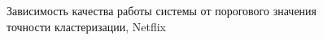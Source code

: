 \documentclass[a4paper, 12pt]{article} %
\begin{document}
	\begin{figure}[h!]
	\begin{minipage}[h]{0.49\linewidth}
	\end{minipage}
	\hfill
	\begin{minipage}[h!]{0.49\linewidth}
	\end{minipage}
	\caption{Зависимость качества работы системы от порогового значения точности кластеризации, Netflix}
	\label{fig:netflix_accuraccur}
	\end{figure}
	
\end{document}
